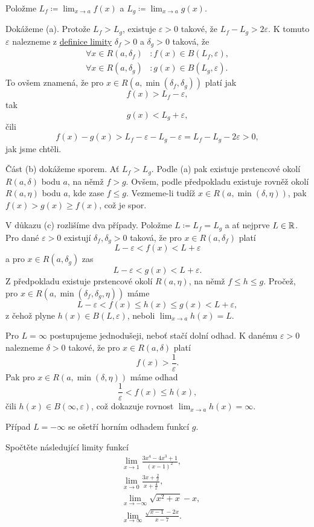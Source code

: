 \begin{thmproof}
 Položme $L_f \coloneqq \lim_{x \to a} f(x)$ a $L_g \coloneqq \lim_{x \to a}
 g(x)$.

 Dokážeme (a). Protože $L_f > L_g$, existuje $\varepsilon > 0$ takové, že $L_f -
 L_g > 2\varepsilon$. K tomuto $\varepsilon$ nalezneme z
 \hyperref[def:oboustranna-limita-funkce]{definice limity} $\delta_f > 0$ a
 $\delta_g > 0$ taková, že
 \begin{align*}
  \forall x \in R(a,\delta_f) &: f(x) \in B(L_f,\varepsilon),\\
  \forall x \in R(a,\delta_g)&: g(x) \in B(L_g,\varepsilon).
 \end{align*}
 To ovšem znamená, že pro $x \in R(a,\min(\delta_f,\delta_g))$ platí jak
 \[
  f(x) > L_f - \varepsilon,
 \]
 tak
 \[
  g(x) < L_g + \varepsilon,
 \]
 čili
 \[
  f(x) - g(x) > L_f - \varepsilon - L_g - \varepsilon = L_f - L_g - 2\varepsilon
  > 0,
 \]
 jak jsme chtěli.

 Část (b) dokážeme sporem. Ať $L_f > L_g$. Podle (a) pak existuje prstencové
 okolí $R(a,\delta)$ bodu $a$, na němž $f > g$. Ovšem, podle předpokladu
 existuje rovněž okolí $R(a,\eta)$ bodu $a$, kde zase $f \leq g$. Vezmeme-li
 tudíž $x \in R(a,\min(\delta,\eta))$, pak $f(x) > g(x) \geq f(x)$, což je spor.

 V důkazu (c) rozlišíme dva případy. Položme $L \coloneqq L_f = L_g$ a ať
 nejprve $L \in \mathbb{R}$. Pro dané $\varepsilon>0$ existují $\delta_f,\delta_g>0$
 taková, že pro $x \in R(a,\delta_f)$ platí
 \[
  L - \varepsilon< f(x) < L + \varepsilon
 \]
 a pro $x \in R(a,\delta_g)$ zas
 \[
  L - \varepsilon < g(x) < L + \varepsilon.
 \]
 Z předpokladu existuje prstencové okolí $R(a,\eta)$, na němž $f \leq h \leq g$.
 Pročež, pro $x \in R(a,\min(\delta_f,\delta_g,\eta))$ máme
 \[
  L - \varepsilon < f(x) \leq h(x) \leq g(x) < L + \varepsilon,
 \]
 z čehož plyne $h(x) \in B(L,\varepsilon)$, neboli $\lim_{x \to a} h(x) = L$.

 Pro $L = \infty$ postupujeme jednodušeji, neboť stačí dolní odhad. K danému
 $\varepsilon>0$ nalezneme $\delta>0$ takové, že pro $x \in R(a,\delta)$ platí
 \[
  f(x) > \frac{1}{\varepsilon}.
 \]
 Pak pro $x \in R(a,\min(\delta,\eta))$ máme odhad
 \[
  \frac{1}{\varepsilon} < f(x) \leq h(x),
 \]
 čili $h(x) \in B(\infty,\varepsilon)$, což dokazuje rovnost $\lim_{x \to a}
 h(x) = \infty$. 

 Případ $L = -\infty$ se ošetří horním odhadem funkcí $g$.
\end{thmproof}

\begin{exercise}{}{}
 Spočtěte následující limity funkcí
 \begin{align*}
  &\lim_{x \to 1} \frac{3x^{4} - 4x^3 + 1}{(x-1)^2},\\
  &\lim_{x \to 0} \frac{3x + \frac{2}{x}}{x + \frac{4}{x}},\\
  &\lim_{x \to -\infty} \sqrt{x^2 + x} - x,\\
  &\lim_{x \to \infty} \frac{\sqrt{x-1}-2x}{x-7}.
 \end{align*}
\end{exercise}

